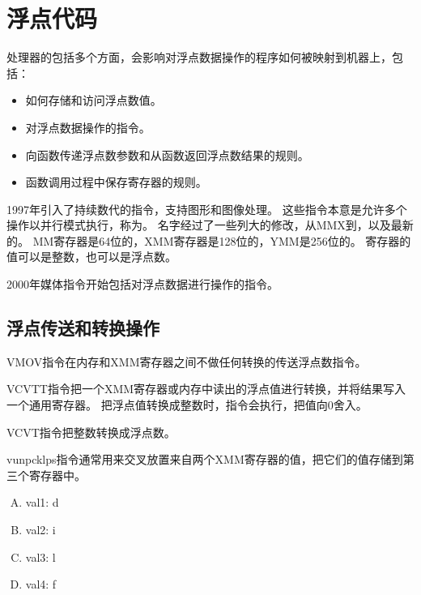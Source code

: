 
\section{浮点代码}
{
    处理器的包括多个方面，会影响对浮点数据操作的程序如何被映射到机器上，包括：

    \begin{itemize}
        \item 如何存储和访问浮点数值。
        \item 对浮点数据操作的指令。
        \item 向函数传递浮点数参数和从函数返回浮点数结果的规则。
        \item 函数调用过程中保存寄存器的规则。
    \end{itemize}

    1997年引入了持续数代的指令，支持图形和图像处理。
    这些指令本意是允许多个操作以并行模式执行，称为。
    名字经过了一些列大的修改，从MMX到，以及最新的。
    MM寄存器是64位的，XMM寄存器是128位的，YMM是256位的。
    寄存器的值可以是整数，也可以是浮点数。

    2000年媒体指令开始包括对浮点数据进行操作的指令。

    \subsection{浮点传送和转换操作}
    {
        VMOV指令在内存和XMM寄存器之间不做任何转换的传送浮点数指令。

        VCVTT指令把一个XMM寄存器或内存中读出的浮点值进行转换，并将结果写入一个通用寄存器。
        把浮点值转换成整数时，指令会执行，把值向0舍入。

        VCVT指令把整数转换成浮点数。

        vunpcklps指令通常用来交叉放置来自两个XMM寄存器的值，把它们的值存储到第三个寄存器中。

        \begin{practicec}
            \begin{enumerate}[A.]
                \item val1: d
                \item val2: i
                \item val3: l
                \item val4: f
            \end{enumerate}
        \end{practicec}

}}

